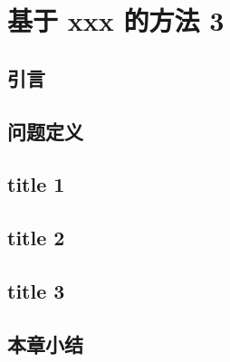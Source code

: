 \chapter{基于 xxx 的方法 3}
\label{ch5}
\section{引言}
\section{问题定义}
\section{title 1}
\section{title 2}
\section{title 3}
\section{本章小结}